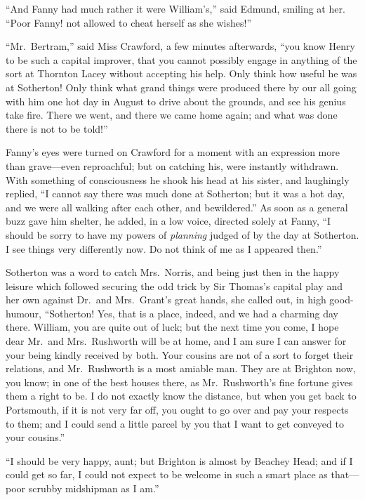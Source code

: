 \documentclass{article}
\begin{document}
``And Fanny had much rather it were William's,'' said Edmund,
smiling at her.  ``Poor Fanny! not allowed to cheat herself
as she wishes!''

``Mr.\ Bertram,'' said Miss Crawford, a few minutes afterwards,
``you know Henry to be such a capital improver, that you
cannot possibly engage in anything of the sort at Thornton
Lacey without accepting his help.  Only think how useful
he was at Sotherton!  Only think what grand things were
produced there by our all going with him one hot day
in August to drive about the grounds, and see his genius
take fire.  There we went, and there we came home again;
and what was done there is not to be told!''

Fanny's eyes were turned on Crawford for a moment
with an expression more than grave---even reproachful;
but on catching his, were instantly withdrawn.
With something of consciousness he shook his head at
his sister, and laughingly replied, ``I cannot say there
was much done at Sotherton; but it was a hot day, and we
were all walking after each other, and bewildered.''
As soon as a general buzz gave him shelter, he added,
in a low voice, directed solely at Fanny, ``I should be
sorry to have my powers of \emph{planning} judged of by the
day at Sotherton.  I see things very differently now.
Do not think of me as I appeared then.''

Sotherton was a word to catch Mrs.\ Norris, and being
just then in the happy leisure which followed securing
the odd trick by Sir Thomas's capital play and her own
against Dr.\ and Mrs.\ Grant's great hands, she called out,
in high good-humour, ``Sotherton!  Yes, that is a place,
indeed, and we had a charming day there.  William, you are
quite out of luck; but the next time you come, I hope dear
Mr.\ and Mrs.\ Rushworth will be at home, and I am sure
I can answer for your being kindly received by both.
Your cousins are not of a sort to forget their relations,
and Mr.\ Rushworth is a most amiable man.  They are at
Brighton now, you know; in one of the best houses there,
as Mr.\ Rushworth's fine fortune gives them a right to be.
I do not exactly know the distance, but when you get back
to Portsmouth, if it is not very far off, you ought to go
over and pay your respects to them; and I could send
a little parcel by you that I want to get conveyed to
your cousins.''

``I should be very happy, aunt; but Brighton is almost
by Beachey Head; and if I could get so far, I could
not expect to be welcome in such a smart place as that---%
poor scrubby midshipman as I am.''
\end{document}
